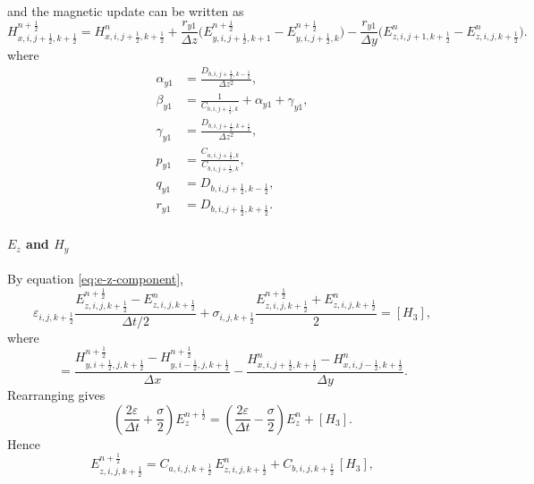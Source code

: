 \documentclass{article}
\numberwithin{equation}{section}
\numberwithin{figure}{section}
\begin{document}
and the magnetic update can be written as
\begin{equation}
    H_{x,i,j+\tfrac12,k+\tfrac12}^{n+\frac12} = H_{x,i,j+\tfrac12,k+\tfrac12}^{n} + \frac{r_{y1}}{\Delta z}\Big(E_{y,i,j+\tfrac12,k+1}^{n+\frac12}-E_{y,i,j+\tfrac12,k}^{n+\frac12}\Big) - \frac{r_{y1}}{\Delta y}\Big(E_{z,i,j+1,k+\tfrac12}^{n}-E_{z,i,j,k+\tfrac12}^{n}\Big).
    \label{eq:adi-first-hx}
\end{equation}
where
\begin{align}
    \alpha_{y1} & =\frac{D_{b,i,j+\tfrac12,k-\tfrac12}}{\Delta z^2},       \\
    \beta_{y1}  & =\frac{1}{C_{b,i,j+\tfrac12,k}}+\alpha_{y1}+\gamma_{y1}, \\
    \gamma_{y1} & =\frac{D_{b,i,j+\tfrac12,k+\tfrac12}}{\Delta z^2},       \\
    p_{y1}      & =\frac{C_{a,i,j+\tfrac12,k}}{C_{b,i,j+\tfrac12,k}},      \\
    q_{y1}      & =D_{b,i,j+\tfrac12,k-\tfrac12},                          \\
    r_{y1}      & =D_{b,i,j+\tfrac12,k+\tfrac12}.
\end{align}

\paragraph{$E_z$ and $H_y$}
By equation \eqref{eq:e-z-component},
\begin{equation}
    \varepsilon_{i,j,k+\tfrac12} \frac{E_{z,i,j,k+\tfrac12}^{n+\frac12}-E_{z,i,j,k+\tfrac12}^{n}}{\Delta t/2} + \sigma_{i,j,k+\tfrac12} \frac{E_{z,i,j,k+\tfrac12}^{n+\frac12}+E_{z,i,j,k+\tfrac12}^{n}}{2} = [H_3],
    \label{eq:first-e-ez}
\end{equation}
where
\begin{equation}
    [H_3] = \frac{H_{y,i+\tfrac12,j,k+\tfrac12}^{n+\frac12}-H_{y,i-\tfrac12,j,k+\tfrac12}^{n+\frac12}}{\Delta x} - \frac{H_{x,i,j+\tfrac12,k+\tfrac12}^{n}-H_{x,i,j-\tfrac12,k+\tfrac12}^{n}}{\Delta y}.
\end{equation}
Rearranging gives
\begin{equation}
    \left(\frac{2\varepsilon}{\Delta t}+\frac{\sigma}{2}\right) E_{z}^{n+\frac12} = \left(\frac{2\varepsilon}{\Delta t}-\frac{\sigma}{2}\right) E_{z}^{n} + [H_3].
\end{equation}
Hence
\begin{equation}
    E_{z,i,j,k+\tfrac12}^{n+\frac12} = C_{a,i,j,k+\tfrac12}\,E_{z,i,j,k+\tfrac12}^{n} + C_{b,i,j,k+\tfrac12}\,[H_3],
    \label{eq:first-e-ez-adi}
\end{equation}
\end{document}
